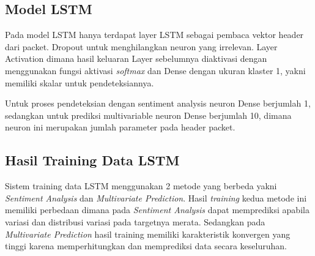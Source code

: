 \documentclass[./skripsi.tex]{subfiles}
\begin{document}
\subsection{Model LSTM}
{\centering
{}
\label{svc_loss}
}
\par Pada model LSTM hanya terdapat layer LSTM sebagai pembaca vektor header dari packet. Dropout untuk menghilangkan neuron yang irrelevan. Layer Activation dimana hasil keluaran Layer sebelumnya diaktivasi dengan menggunakan fungsi aktivasi \textit{softmax} dan Dense dengan ukuran klaster 1, yakni memiliki skalar untuk pendeteksiannya.
\par Untuk proses pendeteksian dengan sentiment analysis neuron Dense berjumlah 1, sedangkan untuk prediksi multivariable neuron Dense berjumlah 10, dimana neuron ini merupakan jumlah parameter pada header packet.
\subsection{Hasil Training Data LSTM}
\par Sistem training data LSTM menggunakan 2 metode yang berbeda yakni \textit{Sentiment Analysis} dan \textit{Multivariate Prediction}. Hasil \textit{training} kedua metode ini memiliki perbedaan dimana pada \textit{Sentiment Analysis} dapat memprediksi apabila variasi dan distribusi variasi pada targetnya merata. Sedangkan pada \textit{Multivariate Prediction} hasil training memiliki karakteristik konvergen yang tinggi karena memperhitungkan dan memprediksi data secara keseluruhan.
\end{document}
